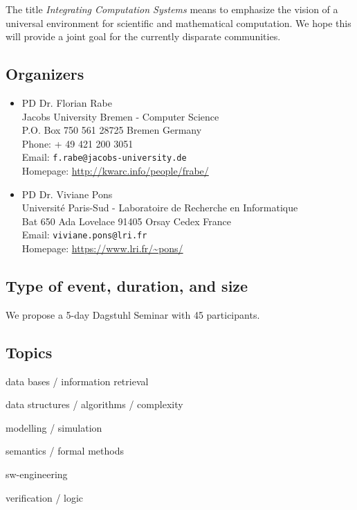 \documentclass[a4paper,11pt]{article}
\begin{document}
The title \emph{Integrating Computation Systems} means to emphasize the vision of a universal environment for scientific and mathematical computation.
We hope this will provide a joint goal for the currently disparate communities.

\subsection{Organizers}

\begin{itemize}
\item PD Dr. Florian Rabe \\
Jacobs University Bremen - Computer Science\\
P.O. Box 750 561
28725 Bremen Germany
\\
Phone: + 49 421 200 3051\\
Email: \texttt{f.rabe@jacobs-university.de}  \\
Homepage: \url{http://kwarc.info/people/frabe/}

\item PD Dr. Viviane Pons \\
Universit\'e Paris-Sud - Laboratoire de Recherche en Informatique\\
Bat 650 Ada Lovelace
91405 Orsay Cedex France 
\\
Email: \texttt{viviane.pons@lri.fr}  \\
Homepage: \url{https://www.lri.fr/~pons/}
\end{itemize}

\subsection{Type of event, duration, and size}

We propose a 5-day Dagstuhl Seminar with 45 participants.

\subsection{Topics}

\begin{compactitem}
 \item data bases / information retrieval
 \item data structures / algorithms / complexity
 \item modelling / simulation
 \item semantics / formal methods
 \item sw-engineering
 \item verification / logic
\end{compactitem}
\end{document}
